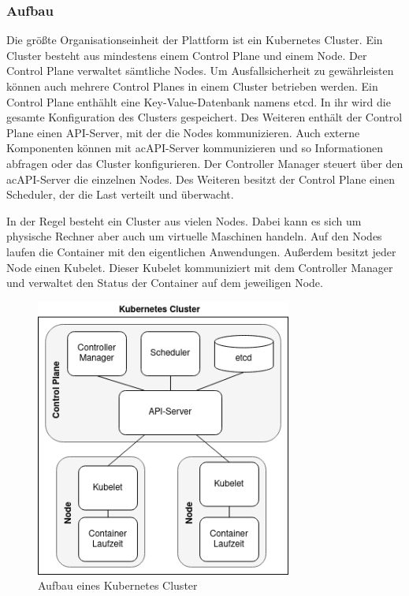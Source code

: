 \subsubsection{Aufbau}

Die größte Organisationseinheit der Plattform ist ein Kubernetes Cluster. Ein Cluster besteht aus mindestens einem Control Plane und einem Node. Der Control Plane verwaltet sämtliche Nodes. Um Ausfallsicherheit zu gewährleisten können auch mehrere Control Planes in einem Cluster betrieben werden. Ein Control Plane enthählt eine Key-Value-Datenbank namens etcd. In ihr wird die gesamte Konfiguration des Clusters gespeichert. Des Weiteren enthält der Control Plane einen \ac{API}-Server, mit der die Nodes kommunizieren. Auch externe Komponenten können mit ac{API}-Server kommunizieren und so Informationen abfragen oder das Cluster konfigurieren. Der Controller Manager steuert über den ac{API}-Server die einzelnen Nodes. Des Weiteren besitzt der Control Plane einen Scheduler, der die Last verteilt und überwacht.

In der Regel besteht ein Cluster aus vielen Nodes. Dabei kann es sich um physische Rechner aber auch um virtuelle Maschinen handeln. Auf den Nodes laufen die Container mit den eigentlichen Anwendungen. Außerdem besitzt jeder Node einen Kubelet. Dieser Kubelet kommuniziert mit dem Controller Manager und verwaltet den Status der Container auf dem jeweiligen Node.

\begin{figure}[H] 
    \centering
    \includegraphics[width=0.75\textwidth]{figures/KubernetesCluster.png}
    \caption{Aufbau eines Kubernetes Cluster}
\end{figure}

